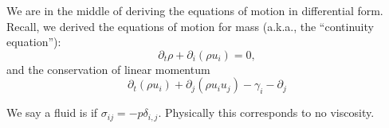 
\lecture[]{}

\begin{node}
We are in the middle of deriving the equations of motion in
differential form. Recall, we derived the equations of motion for mass
(a.k.a., the ``continuity equation''):
\begin{equation}
\partial_{t}\rho+\partial_{i}(\rho u_{i})=0,
\end{equation}
and the conservation of linear momentum
\begin{equation}
\partial_{t}(\rho u_{i})+\partial_{j}(\rho u_{i}u_{j})-\gamma_{i}-\partial_{j}
\end{equation}
\end{node}

\begin{definition}
We say a fluid is  if
$\sigma_{ij}=-p\delta_{i,j}$. Physically this corresponds to no viscosity.
\end{definition}

